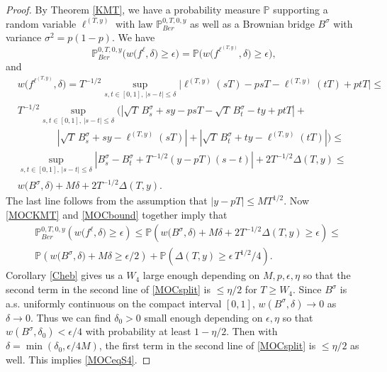 \begin{proof}
	By Theorem \ref{KMT}, we have a probability measure $\mathbb{P}$ supporting a random variable $\ell^{(T,y)}$ with law $\mathbb{P}^{0,T,0,y}_{Ber}$ as well as a Brownian bridge $B^\sigma$ with variance $\sigma^2 = p(1-p)$. We have
	\begin{equation}\label{MOCKMT}
	\mathbb{P}^{0,T,0,y}_{Ber}\Big( w\big({f^\ell},\delta\big) \geq \epsilon \Big) = \mathbb{P}\Big( w\big(f^{\ell^{(T,y)}},\delta\big) \geq \epsilon \Big),
	\end{equation}
	and
	\begin{equation}\label{MOCbound}
	\begin{split}
	& w\big(f^{\ell^{(T,y)}},\delta\big) = T^{-1/2} \sup_{s,t\in[0,1],\, |s-t|\leq\delta} \Big| \ell^{(T,y)}(sT) - psT - \ell^{(T,y)}(tT) + ptT \Big| \leq\\
	&T^{-1/2} \sup_{s,t \in [0,1], \, |s-t| \leq \delta} \bigg(\left| \sqrt{T}\,B^\sigma_s + sy - psT - \sqrt{T}\,B^\sigma_t - ty + ptT \right| +\\
	&\qquad \qquad \left|\sqrt{T}\,B^\sigma_s + sy - \ell^{(T,y)}(sT)\right| + \left|\sqrt{T}\,B^\sigma_t + ty - \ell^{(T,y)}(tT)\right|\bigg) \leq\\
	& \sup_{s,t \in [0,1], \, |s-t| \leq \delta} \left| B^\sigma_s - B^\sigma_t + T^{-1/2} (y-pT)(s-t)\right| + 2T^{-1/2}\Delta(T,y) \leq\\
	& w\big(B^\sigma,\delta\big) + M\delta + 2T^{-1/2}\Delta(T,y).
	\end{split}
	\end{equation}
	The last line follows from the assumption that $|y-pT|\leq MT^{1/2}$. Now \eqref{MOCKMT} and \eqref{MOCbound} together imply that
	\begin{equation}\label{MOCsplit}
	\begin{split}
	&\mathbb{P}^{0,T,0,y}_{Ber}\left( w\big(f^{\ell},\delta\big) \geq \epsilon \right) \leq \mathbb{P}\left( w\big(B^\sigma,\delta\big) + M\delta + 2T^{-1/2}\Delta(T,y) \geq \epsilon \right) \leq\\
	&\mathbb{P}\left( w\big(B^\sigma,\delta\big) + M\delta \geq \epsilon/2 \right) + \mathbb{P}\left( \Delta(T,y) \geq \epsilon\, T^{1/2}/4 \right).
	\end{split}
	\end{equation}
	Corollary \ref{Cheb} gives us a $W_4$ large enough depending on $M,p,\epsilon,\eta$ so that the second term in the second line of \ref{MOCsplit} is $\leq\eta/2$ for $T\geq W_4$. Since $B^\sigma$ is a.s. uniformly continuous on the compact interval $[0,1]$, $w(B^\sigma,\delta) \to 0$ as $\delta\to 0$. Thus we can find $\delta_0>0$ small enough depending on $\epsilon,\eta$ so that $w(B^\sigma,\delta_0) < \epsilon/4$ with probability at least $1-\eta/2$. Then with $\delta = \min(\delta_0, \epsilon/4M)$, the first term in the second line of \eqref{MOCsplit} is $\leq\eta/2$ as well. This implies \eqref{MOCeqS4}.
\end{proof}

